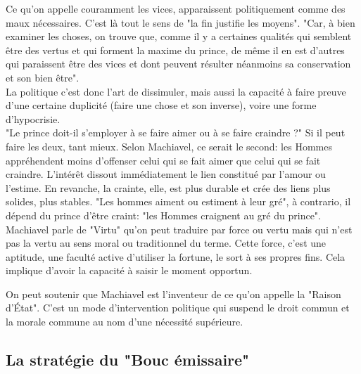 \documentclass[10pt, a4paper, openany]{book}
\begin{document}
Ce qu'on appelle couramment les vices, apparaissent politiquement comme des maux nécessaires. C'est là tout le sens de "la fin justifie les moyens". "Car, à bien examiner les choses, on trouve que, comme il y a certaines qualités qui semblent être des vertus et qui forment la maxime du prince, de même il en est d'autres qui paraissent être des vices et dont peuvent résulter néanmoins sa conservation et son bien être". \\
La politique c'est donc l'art de dissimuler, mais aussi la capacité à faire preuve d'une certaine duplicité (faire une chose et son inverse), voire une forme d'hypocrisie. \\
"Le prince doit-il s'employer à se faire aimer ou à se faire craindre ?" Si il peut faire les deux, tant mieux. Selon Machiavel, ce serait le second: les Hommes appréhendent moins d'offenser celui qui se fait aimer que celui qui se fait craindre. L'intérêt dissout immédiatement le lien constitué par l'amour ou l'estime. En revanche, la crainte, elle, est plus durable et crée des liens plus solides, plus stables. "Les hommes aiment ou estiment à leur gré", à contrario, il dépend du prince d'être craint: "les Hommes craignent au gré du prince". \\
Machiavel parle de "Virtu" qu'on peut traduire par force ou vertu mais qui n'est pas la vertu au sens moral ou traditionnel du terme. Cette force, c'est une aptitude, une faculté active d'utiliser la fortune, le sort à ses propres fins. Cela implique d'avoir la capacité à saisir le moment opportun. 


On peut soutenir que Machiavel est l'inventeur de ce qu'on appelle la "Raison d'État". C'est un mode d'intervention politique qui suspend le droit commun et la morale commune au nom d'une nécessité supérieure. 


\subsection{La stratégie du "Bouc émissaire"}
\end{document}
